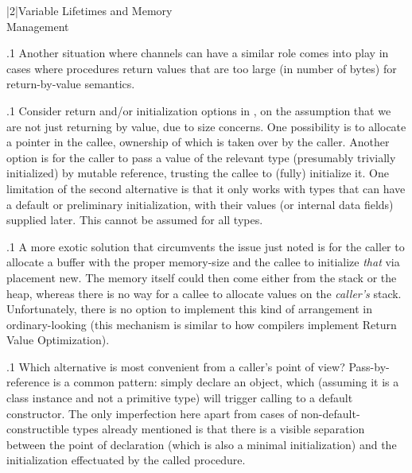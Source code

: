 \documentclass[11pt, twocolumn]{article}
\begin{document}
\s|2|{Variable Lifetimes and Memory\\Management}

\p.1{%
Another situation where channels can have a similar role comes
into play in cases where procedures return values that are
too large (in number of bytes) for return-by-value semantics.
}%

\p.1{%
Consider return and/or initialization options in , on the
assumption that we are not just returning by value, due to size concerns. One possibility is to allocate a pointer
in the callee, ownership of which is taken over by the
caller. Another option is for the
caller to pass a value of the relevant type (presumably
trivially initialized) by mutable
reference, trusting the callee to (fully) initialize it. One limitation
of the second alternative is that it only works with types
that can have a default or preliminary initialization,
with their  values (or internal data fields)
supplied later. This cannot be assumed for all types.
}%

\p.1{%
A more exotic solution that circumvents the issue just noted
is for the caller to allocate a buffer with the proper
memory-size and the callee to initialize \textit{that} via
placement new. The memory itself could then come either
from the stack or the heap, whereas there is no way
for a callee to allocate values on the \textit{caller's} stack.
Unfortunately, there is no option to implement this kind
of arrangement in
ordinary-looking  (this mechanism is similar
to how compilers implement Return Value Optimization).
}%

\p.1{%
Which alternative is most convenient from a caller's point
of view? Pass-by-reference is a common  pattern:
simply declare an object, which (assuming it is a class instance
and not a primitive type) will trigger calling
to a default constructor. The only imperfection
here \mdash{} apart from cases of non-default-constructible
types already mentioned \mdash{} is that there is a visible
separation between the point of declaration (which is
also a minimal initialization) and the 
initialization effectuated by the called procedure.\newpage{}
}%
\end{document}
